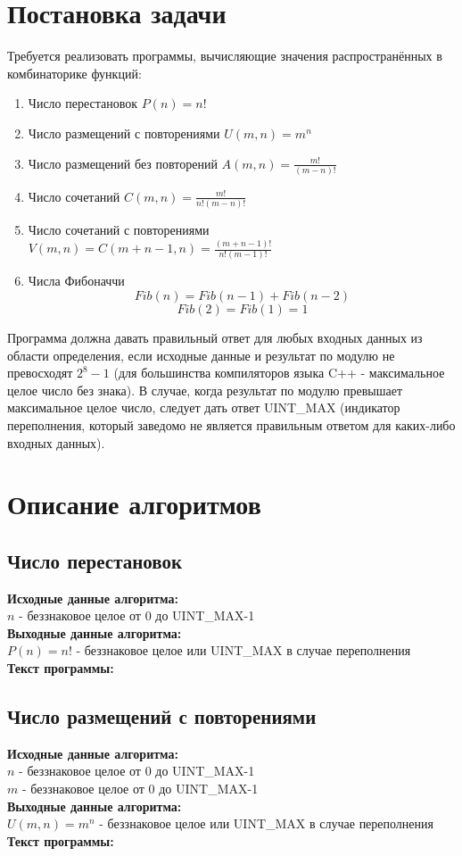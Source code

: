 \documentclass[zuev-report.tex]{subfiles}
\begin{document}
\section{Постановка задачи}
Требуется реализовать программы, вычисляющие значения распространённых в комбинаторике функций:\\
\begin{enumerate}
	\item Число перестановок $P(n)=n!$
	\item Число размещений с повторениями $U(m,n)=m^n$
	\item Число размещений без повторений $A(m,n)=\frac{m!}{(m−n)!}$
	\item Число сочетаний $C(m,n)=\frac{m!}{n!(m−n)!}$
	\item Число сочетаний с повторениями $V(m,n)=C(m+n−1,n)=\frac{(m+n−1)!}{n!(m−1)!}$
	\item Числа Фибоначчи 
	$$Fib(n)=Fib(n-1)+Fib(n-2)$$
	$$Fib(2)=Fib(1)=1$$
\end{enumerate}
Программа должна давать правильный ответ для любых входных данных из области определения, если исходные данные и результат по модулю не превосходят $2^{8}-1$ (для большинства компиляторов языка C++ - максимальное целое число без знака). В случае, когда результат по модулю превышает максимальное целое число, следует дать ответ UINT\_MAX (индикатор переполнения, который заведомо не является правильным ответом для каких-либо входных данных).
\newpage
\section{Описание алгоритмов}
\def \txtIn {\textbf{Исходные данные алгоритма:}\\}
\def \txtOut {\textbf{Выходные данные алгоритма:}\\}
\def \txtTxt {\textbf{Текст программы:}}
\subsection{Число перестановок}
\txtIn
$n$ - беззнаковое целое от 0 до UINT\_MAX-1\\
\txtOut
$P(n)=n!$ - беззнаковое целое или UINT\_MAX в случае переполнения\\
\txtTxt
\label{permutations}

\subsection{Число размещений с повторениями}
\txtIn
$n$ - беззнаковое целое от 0 до UINT\_MAX-1\\
$m$ - беззнаковое целое от 0 до UINT\_MAX-1\\
\txtOut
$U(m,n)=m^n$ - беззнаковое целое или UINT\_MAX в случае переполнения\\
\txtTxt
\label{perm_with_repet}

\end{document}
